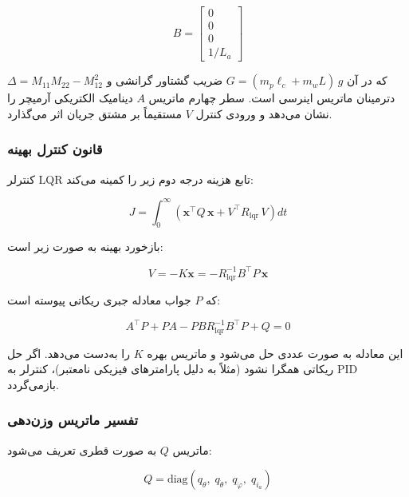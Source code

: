 \begin{equation}
B = \begin{bmatrix} 0 \\ 0 \\ 0 \\ 1/L_a \end{bmatrix}
\end{equation}

که در آن $G = (m_p \ell_c + m_w L)\,g$ ضریب گشتاور گرانشی و $\Delta = M_{11}M_{22} - M_{12}^2$ دترمینان ماتریس اینرسی است. سطر چهارم ماتریس $A$ دینامیک الکتریکی آرمیچر را نشان می‌دهد و ورودی کنترل $V$ مستقیماً بر مشتق جریان اثر می‌گذارد.

\subsubsection{قانون کنترل بهینه}

کنترلر LQR تابع هزینه درجه دوم زیر را کمینه می‌کند:

\begin{equation}
J = \int_0^\infty \left(\mathbf{x}^\top Q\,\mathbf{x} + V^\top R_{\text{lqr}}\,V\right) dt
\label{eq:lqr-cost}
\end{equation}

بازخورد بهینه به صورت زیر است:

\begin{equation}
V = -K\mathbf{x} = -R_{\text{lqr}}^{-1} B^\top P\,\mathbf{x}
\end{equation}

که $P$ جواب معادله جبری ریکاتی پیوسته است:

\begin{equation}
A^\top P + PA - PBR_{\text{lqr}}^{-1}B^\top P + Q = 0
\end{equation}

این معادله به صورت عددی حل می‌شود و ماتریس بهره $K$ را به‌دست می‌دهد. اگر حل ریکاتی همگرا نشود (مثلاً به دلیل پارامترهای فیزیکی نامعتبر)، کنترلر به PID بازمی‌گردد.

\subsubsection{تفسیر ماتریس وزن‌دهی}

ماتریس $Q$ به صورت قطری تعریف می‌شود:

\begin{equation}
Q = \text{diag}(q_\theta,\; q_{\dot\theta},\; q_{\dot\varphi},\; q_{i_a})
\end{equation}

